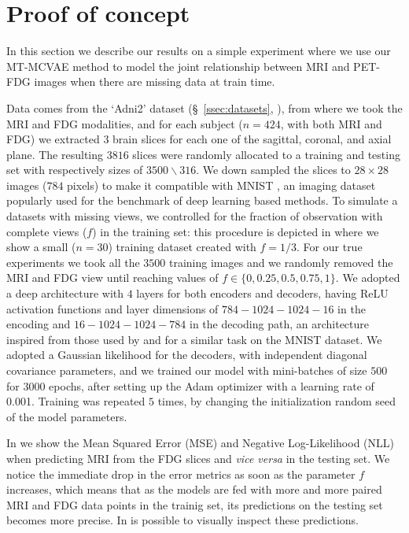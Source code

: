 \section{Proof of concept}
\label{sec:proof_of_concept}

In this section we describe our results on a simple experiment where we use our MT-MCVAE method to model the joint relationship between MRI and PET-FDG images when there are missing data at train time.

Data comes from the `Adni2' dataset (\S~\ref{ssec:datasets}, ), from where we took the MRI and FDG modalities, and for each subject ($n=424$, with both MRI and FDG) we extracted $3$ brain slices for each one of the sagittal, coronal, and axial plane.
The resulting $3816$ slices were randomly allocated to a training and testing set with respectively sizes of $3500\backslash 316$.
We down sampled the slices to $28 \times 28$ images ($784$ pixels) to make it compatible with MNIST \citep{mnist}, an imaging dataset popularly used for the benchmark of deep learning based methods.
%
To simulate a datasets with missing views, we controlled for the fraction of observation with complete views ($f$) in the training set:
this procedure is depicted in  where we show a small ($n=30$) training dataset created with $f=1/3$.
%
For our true experiments we took all the $3500$ training images and we randomly removed the MRI and FDG view until reaching values of $f \in \{0, 0.25, 0.5, 0.75, 1\}$.
We adopted a deep architecture with $4$ layers for both encoders and decoders, having ReLU activation functions and layer dimensions of $784-1024-1024-16$ in the encoding and $16-1024-1024-784$ in the decoding path,
an architecture inspired from those used by \cite{dcca1} and \cite{dcca2} for a similar task on the MNIST dataset.
We adopted a Gaussian likelihood for the decoders, with independent diagonal covariance parameters, and we trained our model with mini-batches of size $500$ for $3000$ epochs, after setting up the Adam optimizer with a learning rate of 0.001.
Training was repeated $5$ times, by changing the initialization random seed of the model parameters.



In  we show the Mean Squared Error (MSE) and Negative Log-Likelihood (NLL) when predicting MRI from the FDG slices and \textit{vice versa} in the testing set.
We notice the immediate drop in the error metrics as soon as the parameter $f$ increases, which means that as the models are fed with more and more paired MRI and FDG data points in the trainig set, its predictions on the testing set becomes more precise.
%
In  is possible to visually inspect these predictions.

